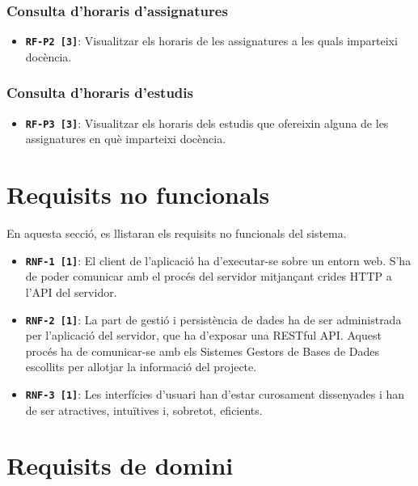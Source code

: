 \documentclass[a4paper,12pt]{ThesisStyle}
\begin{document}
\subsubsection{Consulta d'horaris d'assignatures}
\begin{itemize}
  \item \texttt{\textbf{RF-P2 [3]}}: Visualitzar els horaris de les assignatures a les quals imparteixi docència.
\end{itemize}

\subsubsection{Consulta d'horaris d'estudis}
\begin{itemize}
  \item \texttt{\textbf{RF-P3 [3]}}: Visualitzar els horaris dels estudis que ofereixin alguna de les assignatures en què imparteixi docència.
\end{itemize}

\section{Requisits no funcionals}
\label{sec:requisits_no_funcionals}

En aquesta secció, es llistaran els requisits no funcionals del sistema.

\begin{itemize}
  \item \texttt{\textbf{RNF-1 [1]}}: El client de l'aplicació ha d'executar-se sobre un entorn web. S'ha de poder comunicar amb el procés del servidor mitjançant crides HTTP a l'API del servidor.
  \item \texttt{\textbf{RNF-2 [1]}}: La part de gestió i persistència de dades ha de ser administrada per l'aplicació del servidor, que ha d'exposar una RESTful API. Aquest procés ha de comunicar-se amb els Sistemes Gestors de Bases de Dades escollits per allotjar la informació del projecte.
  \item \texttt{\textbf{RNF-3 [1]}}: Les interfícies d'usuari han d'estar curosament dissenyades i han de ser atractives, intuïtives i, sobretot, eficients.
\end{itemize}

\section{Requisits de domini}
\label{sec:requisits_domini}
\end{document}
